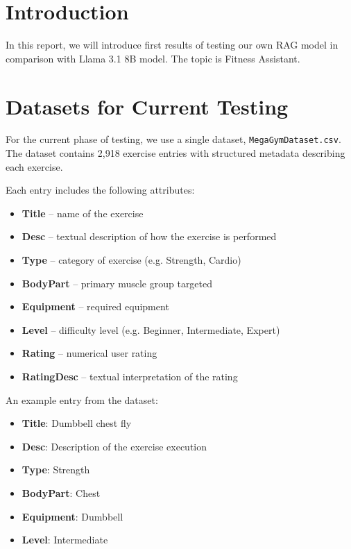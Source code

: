 \documentclass[fleqn,moreauthors,10pt]{ds_report}
\affiliation{\textit{Advisors: Aleš Žagar}}
\begin{document}
\flushbottom
\maketitle
\thispagestyle{empty}

\section*{Introduction}

In this report, we will introduce first results of testing our own RAG model in comparison with Llama 3.1 8B model. The topic is Fitness Assistant. 

\section*{Datasets for Current Testing}

For the current phase of testing, we use a single dataset, \texttt{MegaGymDataset.csv}. 
The dataset contains 2,918 exercise entries with structured metadata describing each exercise.

Each entry includes the following attributes:

\begin{itemize}
\item \textbf{Title} – name of the exercise
\item \textbf{Desc} – textual description of how the exercise is performed
\item \textbf{Type} – category of exercise (e.g. Strength, Cardio)
\item \textbf{BodyPart} – primary muscle group targeted
\item \textbf{Equipment} – required equipment
\item \textbf{Level} – difficulty level (e.g. Beginner, Intermediate, Expert)
\item \textbf{Rating} – numerical user rating
\item \textbf{RatingDesc} – textual interpretation of the rating
\end{itemize}

An example entry from the dataset:

\begin{itemize}
\item \textbf{Title}: Dumbbell chest fly
\item \textbf{Desc}: Description of the exercise execution
\item \textbf{Type}: Strength
\item \textbf{BodyPart}: Chest
\item \textbf{Equipment}: Dumbbell
\item \textbf{Level}: Intermediate
\end{itemize}
\end{document}
